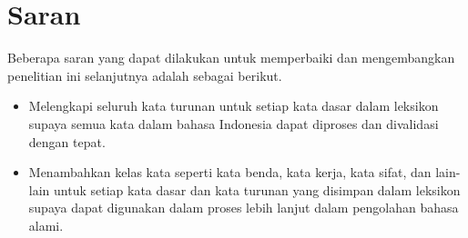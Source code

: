 \section{Saran}
\label{sec:saran}

Beberapa saran yang dapat dilakukan untuk memperbaiki dan mengembangkan penelitian ini selanjutnya adalah sebagai berikut.

\begin{itemize}
	\item Melengkapi seluruh kata turunan untuk setiap kata dasar dalam leksikon supaya semua kata dalam bahasa Indonesia dapat diproses dan divalidasi dengan tepat.
	\item Menambahkan kelas kata seperti kata benda, kata kerja, kata sifat, dan lain-lain untuk setiap kata dasar dan kata turunan yang disimpan dalam leksikon supaya dapat digunakan dalam proses lebih lanjut dalam pengolahan bahasa alami.
\end{itemize}
